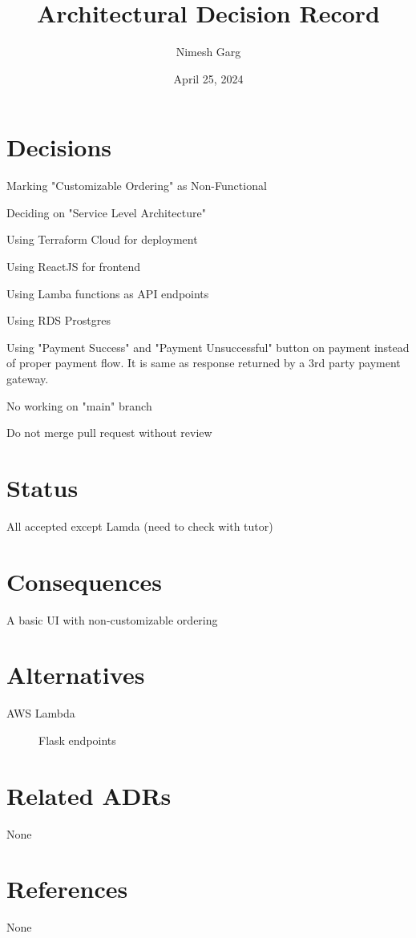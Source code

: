 \documentclass{article}
\title{Architectural Decision Record}
\author{Nimesh Garg}
\date{April 25, 2024}
\begin{document}
\maketitle

\section{Decisions}
\begin{description}
\item Marking "Customizable Ordering" as Non-Functional   
\item Deciding on "Service Level Architecture" 
\item Using Terraform Cloud for deployment
\item Using ReactJS for frontend
\item Using Lamba functions as API endpoints
\item Using RDS Prostgres
\item Using "Payment Success" and "Payment Unsuccessful" button on payment instead of proper payment flow. It is same as response returned by a 3rd party payment gateway.
\item No working on "main" branch
\item Do not merge pull request without review

\end{description}

\section{Status}
\begin{description}
    \item All accepted except Lamda (need to check with tutor)
\end{description}

\section{Consequences}
\begin{description}
    \item A basic UI with non-customizable ordering
\end{description}

\section{Alternatives}
\begin{description}
    \item[AWS Lambda] Flask endpoints
\end{description}


\section{Related ADRs}
None

\section{References}
None
\end{document}
